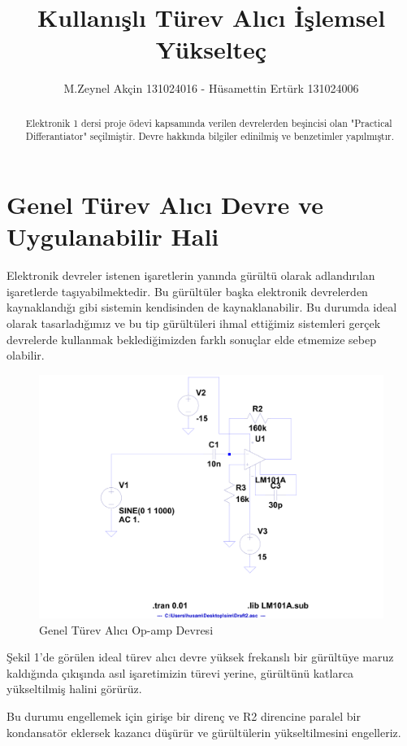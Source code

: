 \documentclass[]{scrartcl}
\title{Kullanışlı Türev Alıcı İşlemsel Yükselteç}
\author{M.Zeynel Akçin 131024016 - Hüsamettin Ertürk 131024006}
\begin{document}
\maketitle

\begin{abstract}
Elektronik 1 dersi proje ödevi kapsamında verilen devrelerden beşincisi olan "Practical Differantiator" seçilmiştir. Devre hakkında bilgiler edinilmiş ve benzetimler yapılmıştır.
\end{abstract}

\section{Genel Türev Alıcı Devre ve Uygulanabilir Hali}
Elektronik devreler istenen işaretlerin yanında gürültü olarak adlandırılan işaretlerde taşıyabilmektedir. Bu gürültüler başka elektronik devrelerden kaynaklandığı gibi sistemin kendisinden de kaynaklanabilir. Bu durumda ideal olarak tasarladığımız ve bu tip gürültüleri ihmal ettiğimiz sistemleri gerçek devrelerde kullanmak beklediğimizden farklı sonuçlar elde etmemize sebep olabilir.

\begin{figure}
	\shorthandoff{=}
	\includegraphics[width=\linewidth]{Draft4}
	\shorthandon{=}
	\caption{Genel Türev Alıcı Op-amp Devresi}
\end{figure}

Şekil 1'de görülen ideal türev alıcı devre yüksek frekanslı bir gürültüye maruz kaldığında çıkışında asıl işaretimizin türevi yerine, gürültünü katlarca yükseltilmiş halini görürüz.

Bu durumu engellemek için girişe bir direnç ve R2 direncine paralel bir kondansatör eklersek kazancı düşürür ve gürültülerin yükseltilmesini engelleriz.
\end{document}
